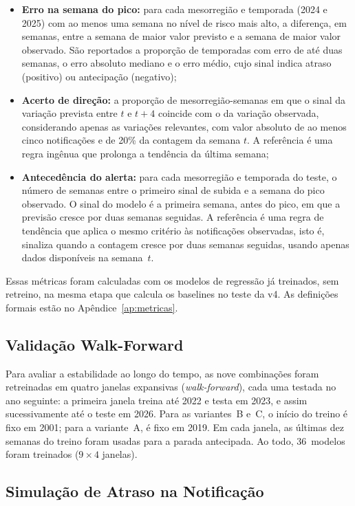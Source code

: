 \begin{itemize}
    \item \textbf{Erro na semana do pico:} para cada mesorregião e temporada (2024 e 2025) com ao menos uma semana no nível de risco mais alto, a diferença, em semanas, entre a semana de maior valor previsto e a semana de maior valor observado. São reportados a proporção de temporadas com erro de até duas semanas, o erro absoluto mediano e o erro médio, cujo sinal indica atraso (positivo) ou antecipação (negativo);
    \item \textbf{Acerto de direção:} a proporção de mesorregião-semanas em que o sinal da variação prevista entre $t$ e $t+4$ coincide com o da variação observada, considerando apenas as variações relevantes, com valor absoluto de ao menos cinco notificações e de 20\% da contagem da semana $t$. A referência é uma regra ingênua que prolonga a tendência da última semana;
    \item \textbf{Antecedência do alerta:} para cada mesorregião e temporada do teste, o número de semanas entre o primeiro sinal de subida e a semana do pico observado. O sinal do modelo é a primeira semana, antes do pico, em que a previsão cresce por duas semanas seguidas. A referência é uma regra de tendência que aplica o mesmo critério às notificações observadas, isto é, sinaliza quando a contagem cresce por duas semanas seguidas, usando apenas dados disponíveis na semana~$t$.
\end{itemize}

Essas métricas foram calculadas com os modelos de regressão já treinados, sem retreino, na mesma etapa que calcula os baselines no teste da v4. As definições formais estão no Apêndice~\ref{ap:metricas}.

\subsection{Validação Walk-Forward}

Para avaliar a estabilidade ao longo do tempo, as nove combinações foram retreinadas em quatro janelas expansivas (\textit{walk-forward}), cada uma testada no ano seguinte: a primeira janela treina até 2022 e testa em 2023, e assim sucessivamente até o teste em 2026. Para as variantes~B e~C, o início do treino é fixo em 2001; para a variante~A, é fixo em 2019. Em cada janela, as últimas dez semanas do treino foram usadas para a parada antecipada. Ao todo, 36~modelos foram treinados ($9 \times 4$ janelas).

\subsection{Simulação de Atraso na Notificação}

